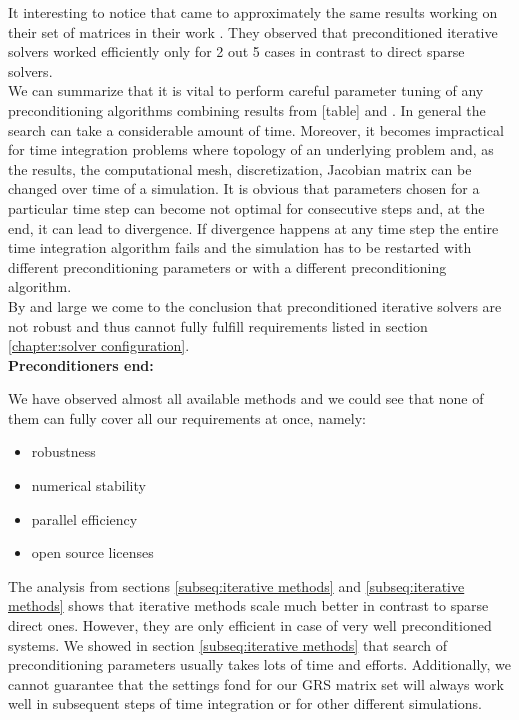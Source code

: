 It interesting to notice that \citeauthor{wsmp} came to approximately the same results working on their set of matrices in their work \cite{wsmp}. They observed that preconditioned iterative solvers worked efficiently only for 2 out 5 cases in contrast to direct sparse solvers.\\

We can summarize that it is vital to perform careful parameter tuning of any preconditioning algorithms combining results from [table] and \cite{wsmp}. In general the  search can take a considerable amount of time. Moreover, it becomes impractical for time integration problems where topology of an underlying problem and, as the results, the computational mesh, discretization, Jacobian matrix can be changed over time of a simulation. It is obvious that parameters chosen for a particular time step can become not optimal for consecutive steps and, at the end, it can lead to divergence. If divergence happens at any time step the entire time integration algorithm fails and the simulation has to be restarted with different preconditioning parameters or with a different preconditioning algorithm.\\

By and large we come to the conclusion that preconditioned iterative solvers are not robust and thus cannot fully fulfill requirements listed in section \ref{chapter:solver configuration}.\\



\textbf{Preconditioners end:}




We have observed almost all available methods and we could see that none of them can fully cover all our requirements at once, namely:

\begin{itemize}
	\item robustness
	\item numerical stability
	\item parallel efficiency
	\item open source licenses
\end{itemize}


The analysis from sections \ref{subseq:iterative methods} and \ref{subseq:iterative methods} shows that iterative methods scale much better in contrast to sparse direct ones. However, they are only efficient in case of very well preconditioned systems. We showed in section \ref{subseq:iterative methods} that search of preconditioning parameters usually takes lots of time and efforts. Additionally, we cannot guarantee that the settings fond for our GRS matrix set will always work well in subsequent steps of time integration or for other different simulations.\\


